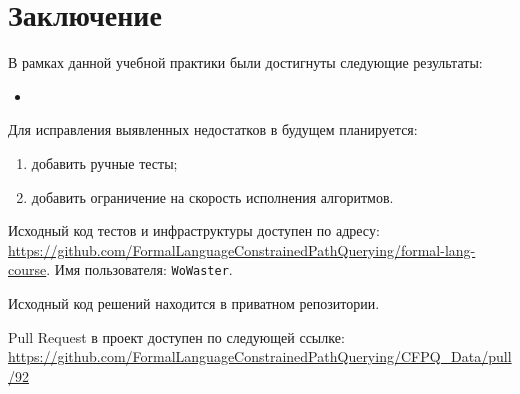
\section*{Заключение}
В рамках данной учебной практики были достигнуты следующие результаты:
\begin{itemize}
    \item {}
\end{itemize}

Для исправления выявленных недостатков в будущем планируется:
\begin{enumerate}
    \item добавить ручные тесты;
    \item добавить ограничение на скорость исполнения алгоритмов.
\end{enumerate}

Исходный код тестов и инфраструктуры доступен по адресу: \url{https://github.com/FormalLanguageConstrainedPathQuerying/formal-lang-course}.
Имя пользователя: \texttt{WoWaster}.

Исходный код решений находится в приватном репозитории.

Pull Request в проект \cfpqdata{} доступен по следующей ссылке: \url{https://github.com/FormalLanguageConstrainedPathQuerying/CFPQ_Data/pull/92}
